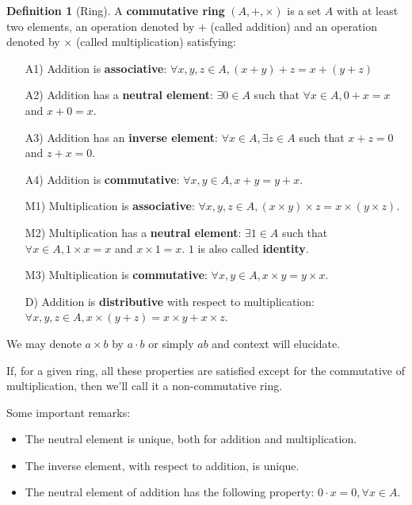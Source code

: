 \documentclass[12pt,a4paper]{article}
\theoremstyle{definition}
\newtheorem{definition}{Definition}[section]
\begin{document}
\begin{definition}[Ring]
A \textbf{commutative ring} \((A, +, \times)\) is a set \(A\) with at least two elements, an operation denoted by \(+\) (called addition) and an operation denoted by \(\times\) (called multiplication) satisfying:
\begin{enumerate}
\item[A1)] Addition is \textbf{associative}: \(\forall x,y,z \in A, (x+y)+z = x+(y+z)\)
\item[A2)] Addition has a \textbf{neutral element}: \(\exists 0 \in A\) such that $\forall x \in A, 0+x = x$ and $x+0 = x$.
\item[A3)] Addition has an \textbf{inverse element}: \(\forall x \in A, \exists z \in A\) such that $x+z = 0$ and $z+x = 0$.
\item[A4)] Addition is \textbf{commutative}: \(\forall x, y \in A, x+y = y+x\).
\item[M1)] Multiplication is \textbf{associative}:  \(\forall x, y, z \in A, (x \times y) \times z = x \times (y \times z)\).
\item[M2)] Multiplication has a \textbf{neutral element}: \(\exists 1 \in A\) such that $\forall x \in A, 1 \times x = x$ and $x \times 1 = x$. $1$ is also called \textbf{identity}.
\item[M3)] Multiplication is \textbf{commutative}: \(\forall x, y \in A, x \times y = y \times x\).
\item[D)] Addition is \textbf{distributive} with respect to multiplication:  \(\forall x, y, z \in A, x \times (y + z) = x \times y + x \times z\).
\end{enumerate}

We may denote \(a \times b\) by \(a \cdot b\) or simply \(ab\) and context will elucidate.
\end{definition}

If, for a given ring, all these properties are satisfied except for the commutative of multiplication, then we'll call it a non-commutative ring.

Some important remarks:
\begin{itemize}
\item The neutral element is unique, both for addition and multiplication.
\item The inverse element, with respect to addition, is unique.
\item The neutral element of addition has the following property: \(0 \cdot x = 0, \forall x \in A\).
\end{itemize}
\end{document}
